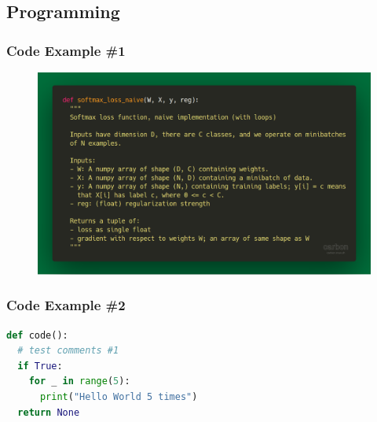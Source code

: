 \documentclass{if-beamer}
\begin{document}
\subsection{Programming}
\begin{frame}[fragile]

\frametitle{Code Example \#1}

\begin{figure}
\centering
\includegraphics[width=\linewidth]{carbon.png}
\end{figure}

\end{frame}

\begin{frame}[fragile]
\frametitle{Code Example \#2}


\begin{lstlisting}[language=Python]
def code():
  # test comments #1    
  if True:
    for _ in range(5):
      print("Hello World 5 times")
  return None     
\end{lstlisting}

\end{frame}
\end{document}
